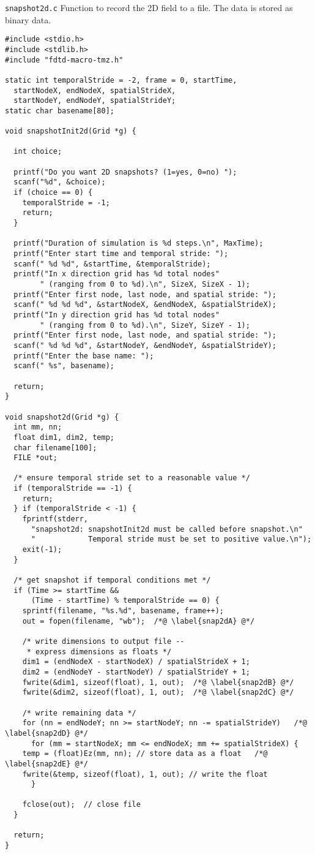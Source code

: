 \begin{program}
{\tt snapshot2d.c} Function to record the 2D field to a file.  The
data is stored as binary data. 
\label{pro:snap2d}
\codemiddle
\begin{lstlisting}
#include <stdio.h>
#include <stdlib.h>
#include "fdtd-macro-tmz.h"

static int temporalStride = -2, frame = 0, startTime,
  startNodeX, endNodeX, spatialStrideX,
  startNodeY, endNodeY, spatialStrideY;
static char basename[80];

void snapshotInit2d(Grid *g) {
  
  int choice;
  
  printf("Do you want 2D snapshots? (1=yes, 0=no) ");
  scanf("%d", &choice);
  if (choice == 0) {
    temporalStride = -1;
    return;
  }

  printf("Duration of simulation is %d steps.\n", MaxTime);
  printf("Enter start time and temporal stride: ");
  scanf(" %d %d", &startTime, &temporalStride);
  printf("In x direction grid has %d total nodes"
        " (ranging from 0 to %d).\n", SizeX, SizeX - 1);
  printf("Enter first node, last node, and spatial stride: ");
  scanf(" %d %d %d", &startNodeX, &endNodeX, &spatialStrideX);
  printf("In y direction grid has %d total nodes"
        " (ranging from 0 to %d).\n", SizeY, SizeY - 1);
  printf("Enter first node, last node, and spatial stride: ");
  scanf(" %d %d %d", &startNodeY, &endNodeY, &spatialStrideY);
  printf("Enter the base name: ");
  scanf(" %s", basename);

  return;
}

void snapshot2d(Grid *g) {
  int mm, nn;
  float dim1, dim2, temp;
  char filename[100];
  FILE *out;

  /* ensure temporal stride set to a reasonable value */
  if (temporalStride == -1) {
    return;
  } if (temporalStride < -1) {
    fprintf(stderr,
      "snapshot2d: snapshotInit2d must be called before snapshot.\n"
      "            Temporal stride must be set to positive value.\n");
    exit(-1);
  }

  /* get snapshot if temporal conditions met */
  if (Time >= startTime && 
      (Time - startTime) % temporalStride == 0) {
    sprintf(filename, "%s.%d", basename, frame++);
    out = fopen(filename, "wb");  /*@ \label{snap2dA} @*/

    /* write dimensions to output file -- 
     * express dimensions as floats */
    dim1 = (endNodeX - startNodeX) / spatialStrideX + 1;
    dim2 = (endNodeY - startNodeY) / spatialStrideY + 1;
    fwrite(&dim1, sizeof(float), 1, out);  /*@ \label{snap2dB} @*/
    fwrite(&dim2, sizeof(float), 1, out);  /*@ \label{snap2dC} @*/

    /* write remaining data */
    for (nn = endNodeY; nn >= startNodeY; nn -= spatialStrideY)   /*@ \label{snap2dD} @*/
      for (mm = startNodeX; mm <= endNodeX; mm += spatialStrideX) {
	temp = (float)Ez(mm, nn); // store data as a float   /*@ \label{snap2dE} @*/
	fwrite(&temp, sizeof(float), 1, out); // write the float
      }

    fclose(out);  // close file
  }

  return;
}
\end{lstlisting}
\end{program}
